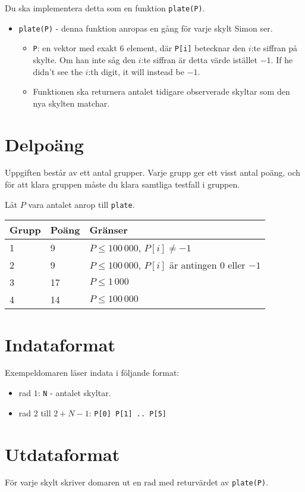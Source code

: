 Du ska implementera detta som en funktion \texttt{plate(P)}.
\begin{itemize}
  \item \texttt{plate(P)} - denna funktion anropas en gång för varje skylt Simon ser.
  \begin{itemize}
    \item \texttt{P}: en vektor med exakt 6 element, där \texttt{P[i]} betecknar den $i$:te siffran på skylte.
      Om han inte såg den $i$:te siffran är detta värde istället $-1$.
      If he didn't see the $i$:th digit, it will instead be $-1$.
    \item Funktionen ska returnera antalet tidigare observerade skyltar som den nya skylten matchar.
  \end{itemize}
\end{itemize}

\section*{Delpoäng}
Uppgiften består av ett antal grupper. Varje grupp ger ett visst antal poäng, och för att klara
gruppen måste du klara samtliga testfall i gruppen.

Låt $P$ vara antalet anrop till \texttt{plate}.

\begin{tabular}{|l|l|l|}
  \hline
  \textbf{Grupp} & \textbf{Poäng} & \textbf{Gränser} \\ \hline
  1 & 9 & $P \le 100\,000$, $P[i] \not= -1$ \\ \hline
  2 & 9 & $P \le 100\,000$, $P[i]$ är antingen $0$ eller $-1$ \\ \hline
  3 & 17 & $P \le 1\,000$ \\ \hline
  4 & 14 & $P \le 100\,000$ \\ \hline
\end{tabular}


\section*{Indataformat}
Exempeldomaren läser indata i följande format:

\begin{itemize}
  \item rad $1$: \texttt{N} - antalet skyltar.
  \item rad $2$ till $2 + N - 1$: \texttt{P[0] P[1] .. P[5]}
\end{itemize}

\section*{Utdataformat}
För varje skylt skriver domaren ut en rad med returvärdet av \texttt{plate(P)}.
